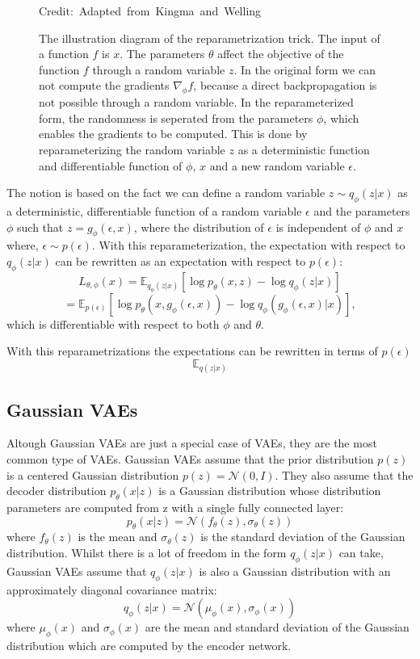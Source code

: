 \begin{figure}[H]
    \caption{The illustration diagram of the reparametrization trick. The input of a function $f$ is $x$. The parameters $\theta$ affect the objective of the function $f$ through a random variable $z$. In the original form we can not compute the gradients $\nabla_{\phi} f$, because a direct backpropagation is not possible through a random variable. In the reparameterized form, the randomness is seperated from the parameters $\phi$, which enables the gradients to be computed. This is done by reparameterizing the random variable $z$ as a deterministic function and differentiable function  of $\phi$, $x$ and a new random variable $\epsilon$.\cite{Kingma_2019}}

    \hspace*{15pt}\hbox{\scriptsize Credit: Adapted from Kingma and Welling\cite{Kingma_2019}  }

\end{figure}
\pagebreak


The notion is based on the fact we can define a random variable $z \sim q_{\phi}(z|x)$ as a deterministic, differentiable function of a random variable $\epsilon$ and the parameters $\phi$ such that $z = g_{\phi}(\epsilon, x)$, where the distribution of $\epsilon$ is independent of $\phi$ and $x$ where, $\epsilon \sim p(\epsilon)$. With this reparameterization, the expectation with respect to $q_{\phi}(z|x)$ can be rewritten as an expectation with respect to $p(\epsilon)$: 
\[ L_{\theta, \phi}(x) = \mathbb{E}_{q_{\phi}(z|x)} [\log p_{\theta}(x, z) - \log q_{\phi}(z|x)] \]
\[ = \mathbb{E}_{p(\epsilon)} [\log p_{\theta}(x, g_{\phi}(\epsilon, x)) - \log q_{\phi}(g_{\phi}(\epsilon, x)|x)], \]
 which is differentiable with respect to both $\phi$ and $\theta$. 

With this reparametrizations the expectations can be rewritten in terms of $p(\epsilon)$
\[ \mathbb{E}_{q(z|x)}\] 


\subsection{Gaussian VAEs}

Altough Gaussian VAEs are just a special case of VAEs, they are the most common type of VAEs. Gaussian VAEs assume that the prior distribution $p(z)$ is a centered Gaussian distribution $ p(z) = \mathcal{N}(0, I)$. They also assume that the decoder distribution $p_{\theta}(x|z)$ is a Gaussian distribution whose distribution parameters are computed from z with a single fully connected layer: 
\[ p_{\theta}(x|z) = \mathcal{N}(f_{\theta}(z), \sigma_{\theta}(z)) \]
where $f_{\theta}(z)$ is the mean and $\sigma_{\theta}(z)$ is the standard deviation of the Gaussian distribution. Whilst there is a lot of freedom in the form $q_{\phi}(z|x)$ can take, Gaussian VAEs assume that $q_{\phi}(z|x)$ is also a Gaussian distribution with an approximately diagonal covariance matrix: 
\[ q_{\phi}(z|x) = \mathcal{N}(\mu_{\phi}(x), \sigma_{\phi}(x)) \]
where $\mu_{\phi}(x)$ and $\sigma_{\phi}(x)$ are the mean and standard deviation of the Gaussian distribution which are computed by the encoder network.

